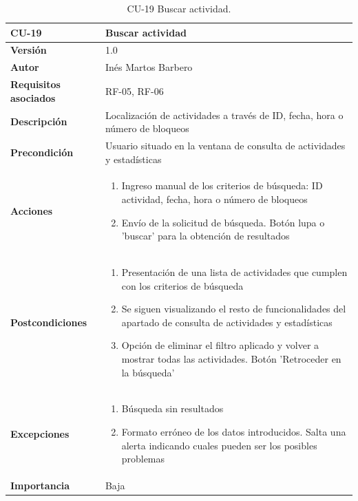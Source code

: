 \begin{table}[p]
	\centering
	\begin{tabularx}{\linewidth}{ p{} p{} }
		\toprule
		\textbf{CU-19}    & \textbf{Buscar actividad}\\
		\toprule
		\textbf{Versión}              & 1.0    \\
		\textbf{Autor}                & Inés Martos Barbero \\
		\textbf{Requisitos asociados} & RF-05, RF-06 \\
		\textbf{Descripción}          & Localización de actividades a través de ID, fecha, hora o número de bloqueos \\
		\textbf{Precondición}         & Usuario situado en la ventana de consulta de actividades y estadísticas \\
		\textbf{Acciones}             &
		\begin{enumerate}
			\def\labelenumi{\arabic{enumi}.}
			\tightlist
			\item Ingreso manual de los criterios de búsqueda: ID actividad, fecha, hora o número de bloqueos
			\item Envío de la solicitud de búsqueda. Botón lupa o 'buscar' para la obtención de resultados
		\end{enumerate}\\
		\textbf{Postcondiciones}        & 
        \begin{enumerate}
			\def\labelenumi{\arabic{enumi}.}
			\tightlist
			\item Presentación de una lista de actividades que cumplen con los criterios de búsqueda
			\item Se siguen visualizando el resto de funcionalidades del apartado de consulta de actividades y estadísticas
            \item Opción de eliminar el filtro aplicado y volver a mostrar todas las actividades. Botón 'Retroceder en la búsqueda'
		\end{enumerate}\\
		\textbf{Excepciones}          & 
        \begin{enumerate}
			\def\labelenumi{\arabic{enumi}.}
			\tightlist
			\item Búsqueda sin resultados
			\item Formato erróneo de los datos introducidos. Salta una alerta indicando cuales pueden ser los posibles problemas
		\end{enumerate}\\
		\textbf{Importancia}          &  Baja \\
		\bottomrule
	\end{tabularx}
	\caption{CU-19 Buscar actividad.}
\end{table}

